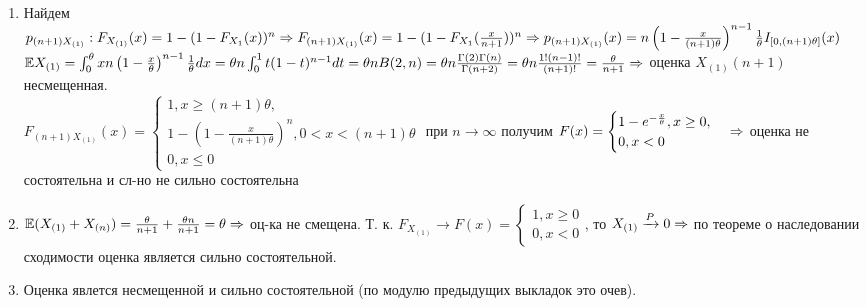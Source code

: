 {\begin{enumerate}
    \item Найдем $p_{(n + 1)X_{(1)}}: F_{X_{(1)}}(x) = 1 - (1 - F_{X_1}(x))^n \Rightarrow F_{(n + 1)X_{(1)}}(x) =  1 - (1 - F_{X_1}(\frac{x}{n + 1}))^n \Rightarrow p_{(n + 1)X_{(1)}}(x) = n\left(1 - \frac{x}{(n + 1)\theta}\right)^{n - 1} \frac{1}{\theta}I_{[0, (n + 1)\theta]}(x)$ \\
    $\mathbb{E} X_{(1)} = \int_{0}^{\theta}xn\left(1 - \frac{x}{\theta}\right)^{n - 1}\frac{1}{\theta}dx = \theta n\int_{0}^{1}t(1 - t)^{n - 1}dt = \theta nB(2, n) = \theta n\frac{\Gamma(2)\Gamma(n)}{\Gamma(n + 2)} = \theta n\frac{1!(n - 1)!}{(n + 1)!} = \frac{\theta}{n + 1} \Rightarrow $ оценка $X_{(1)}(n + 1) $ несмещенная. \\
    $F_{(n + 1)X_{(1)}}(x) = 
    \begin{cases}
     1, x \ge (n + 1)\theta, \\
     1 - \left(1 - \frac{x}{(n + 1)\theta}\right)^n, 0 < x < (n + 1)\theta \\
     0, x \le 0
    \end{cases}
    $ при $n \to \infty$ получим $
    F(x) =
    \begin{cases}
    1 - e^{-\frac{x}{\theta}}, x \ge 0, \\
    0, x < 0
    \end{cases} \Rightarrow 
    $ оценка не состоятельна и сл-но не сильно состоятельна
    \item $\mathbb{E} (X_{(1)} + X_{(n)}) = \frac{\theta}{n + 1} + \frac{\theta n}{n + 1} = \theta \Rightarrow $ оц-ка не смещена.
    Т. к. $F_{X_{(1)}} \to F(x) = 
    \begin{cases}
    1, x \ge 0 \\
    0, x < 0
    \end{cases}
    $, то $X_{(1)} \xrightarrow[]{P} 0 \Rightarrow$ по теореме о наследовании сходимости оценка является сильно состоятельной.
    \item Оценка явлется несмещенной и  сильно состоятельной (по модулю предыдущих выкладок это очев).
  \end{enumerate}
}
